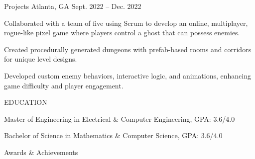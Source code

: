 \documentclass[10pt]{article}
\begin{document}
\begin{customsection}{Projects}
    {Atlanta, GA}
    {Sept. 2022 -- Dec. 2022}
    {}
    {
        \item Collaborated with a team of five using Scrum to develop an online, multiplayer, rogue-like pixel game where players control a ghost that can possess enemies.
        \item Created procedurally generated dungeons with prefab-based rooms and corridors for unique level designs.
        \item Developed custom enemy behaviors, interactive logic, and animations, enhancing game difficulty and player engagement.
    }

\end{customsection}

\begin{customsection}{EDUCATION}

    {Master of Engineering in Electrical \& Computer Engineering, GPA: 3.6/4.0}

    {Bachelor of Science in Mathematics \& Computer Science, GPA: 3.6/4.0}

\end{customsection}


\begin{customsectionnoskip}{Awards \& Achievements}


\end{customsectionnoskip}

\end{document}
